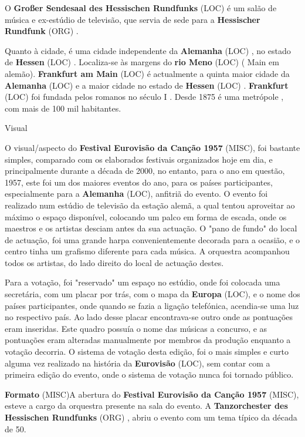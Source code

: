 \documentclass[12pt,a4paper]{article}
\begin{document}
O \textbf{Großer Sendesaal des Hessischen Rundfunks} (LOC) é um salão de música e ex-estúdio de televisão, que servia de sede para a \textbf{Hessischer Rundfunk} (ORG) .

Quanto à cidade, é uma cidade independente da \textbf{Alemanha} (LOC) , no estado de \textbf{Hessen} (LOC) . Localiza-se às margens do \textbf{rio Meno} (LOC) ( Main em alemão). \textbf{Frankfurt am Main} (LOC) é actualmente a quinta maior cidade da \textbf{Alemanha} (LOC) e a maior cidade no estado de \textbf{Hessen} (LOC) . \textbf{Frankfurt} (LOC) foi fundada pelos romanos no século I . Desde 1875 é uma metrópole , com mais de 100 mil habitantes.



Visual

O visual/aspecto do \textbf{Festival Eurovisão da Canção 1957} (MISC), foi bastante simples, comparado com os elaborados festivais organizados hoje em dia, e principalmente durante a década de 2000, no entanto, para o ano em questão, 1957, este foi um dos maiores eventos do ano, para os países participantes, especialmente para a \textbf{Alemanha} (LOC), anfitriã do evento. O evento foi realizado num estúdio de televisão da estação alemã, a qual tentou aproveitar ao máximo o espaço disponível, colocando um palco em forma de escada, onde os maestros e os artistas desciam antes da sua actuação. O "pano de fundo" do local de actuação, foi uma grande harpa convenientemente decorada para a ocasião, e o centro tinha um grafismo diferente para cada música. A orquestra acompanhou todos os artistas, do lado direito do local de actuação destes.

Para a votação, foi "reservado" um espaço no estúdio, onde foi colocada uma secretária, com um placar por trás, com o mapa da \textbf{Europa} (LOC), e o nome dos países participantes, onde quando se fazia a ligação telefónica, acendia-se uma luz no respectivo país. Ao lado desse placar encontrava-se outro onde as pontuações eram inseridas. Este quadro possuía o nome das músicas a concurso, e as pontuações eram alteradas manualmente por membros da produção enquanto a votação decorria. O sistema de votação desta edição, foi o mais simples e curto alguma vez realizado na história da \textbf{Eurovisão} (LOC), sem contar com a primeira edição do evento, onde o sistema de votação nunca foi tornado público.



\textbf{Formato} (MISC)A abertura do \textbf{Festival Eurovisão da Canção 1957} (MISC), esteve a cargo da orquestra presente na sala do evento. A \textbf{Tanzorchester des Hessischen Rundfunks} (ORG) , abriu o evento com um tema típico da década de 50.
\end{document}

